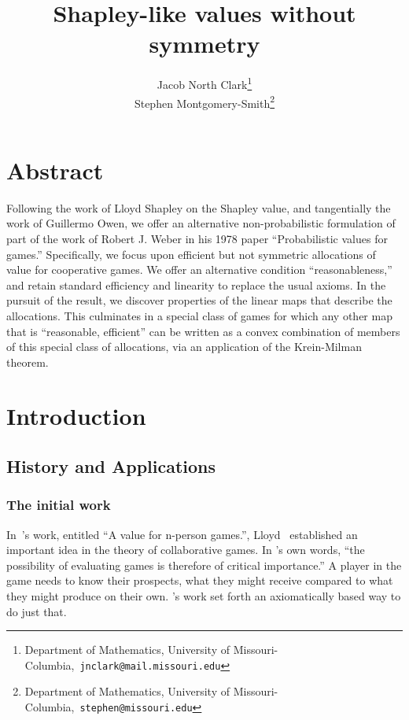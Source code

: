 \documentclass[12pt,letterpaper,final]{article}
\theoremstyle{plain}
\theoremstyle{plain}
\theoremstyle{plain}
\theoremstyle{plain}
\theoremstyle{plain}
\theoremstyle{plain}
\theoremstyle{plain}
\theoremstyle{definition}
\theoremstyle{definition}
\theoremstyle{definition}
\theoremstyle{definition}
\theoremstyle{definition}
\theoremstyle{remark}
\theoremstyle{remark}
\theoremstyle{remark}
\theoremstyle{remark}
\begin{document}
\newcommand{\dissertationtitle}{Shapley-like values without symmetry}
\title{\dissertationtitle}

\author{Jacob North Clark\thanks{Department of Mathematics, University
    of Missouri-Columbia,~\texttt{jnclark@mail.missouri.edu}}\\Stephen
  Montgomery-Smith\thanks{Department of Mathematics, University of
    Missouri-Columbia,~\texttt{stephen@missouri.edu}}}
\date{}
\maketitle


\section*{\centering Abstract}

Following the work of Lloyd Shapley on the Shapley value, and
tangentially the work of Guillermo Owen, we offer an alternative
non-probabilistic formulation of part of the work of Robert J. Weber
in his 1978 paper ``Probabilistic values for games.''  Specifically,
we focus upon efficient but not symmetric allocations of value for
cooperative games. We offer an alternative condition
``reasonableness,'' and retain standard efficiency and linearity to
replace the usual axioms. In the pursuit of the result, we discover
properties of the linear maps that describe the allocations. This
culminates in a special class of games for which any other map that is
``reasonable, efficient'' can be written as a convex combination of
members of this special class of allocations, via an application of
the Krein-Milman theorem.

\section{Introduction}\label{cha:introduction}

\subsection{History and Applications}

\subsubsection{The initial work}
In~\citeauthor{Shapley53}'s \citeyear{Shapley53} work, entitled ``A value for n-person games.'', Lloyd~\citeauthor{Shapley53} established an important idea in the theory of
collaborative games. In \citeauthor{Shapley53}'s own words,
``the possibility of evaluating games is therefore of critical
importance.'' A player in the game needs to know their
prospects, what they might receive compared to what they might
produce on their own. \citeauthor{Shapley53}'s work set forth an axiomatically
based way to do just that.
\end{document}
